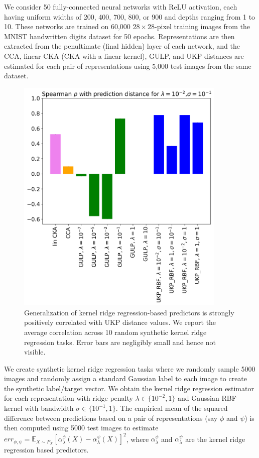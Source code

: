 \documentclass[11pt]{article}
\newcommand{\E}{\mathbb{E}}
\newcommand{\repone}{\phi}
\newcommand{\reptwo}{\psi}
\newcommand{\metricstname}{UKP }
\theoremstyle{plain}
\begin{document}
We consider 50 fully-connected neural networks with ReLU activation, each having uniform widths of 200, 400, 700, 800, or 900 and depths ranging from 1 to 10. These networks are trained on 60,000 $28 \times 28$-pixel training images from the MNIST handwritten digits dataset \cite{deng2012mnist} for 50 epochs. Representations are then extracted from the penultimate (final hidden) layer of each network, and the CCA, linear CKA (CKA with a linear kernel), GULP, and UKP distances are estimated for each pair of representations using 5,000 test images from the same dataset.

\begin{figure}[h]
\begin{center}
\includegraphics[width=10cm]{Figures/krrgen_mnist/generalization_lambda0.01_sigma0.1.png}
\caption{Generalization of kernel ridge regression-based predictors is strongly positively correlated with \metricstname distance values. We report the average correlation across 10 random synthetic kernel ridge regression tasks. Error bars are negligibly small and hence not visible.}
\label{Generalization plot}
\end{center}
\vspace{-4mm}
\end{figure}

We create synthetic kernel ridge regression tasks where we randomly sample 5000 images and randomly assign a standard Gaussian label to each image to create the synthetic label/target vector. We obtain the kernel ridge regression estimator for each representation with ridge penalty $\lambda \in \{10^{-2},1\}$ and Gaussian RBF kernel with bandwidth $\sigma \in \{10^{-1}, 1\}$. The empirical mean of the squared difference between predictions based on a pair of representations (say $\repone$ and $\reptwo$) is then computed using 5000 test images to estimate $err_{\repone,\reptwo} = \E_{X \sim P_{X}}\left[\alpha_{\lambda}^{\repone}(X)-\alpha_{\lambda}^{\reptwo}(X)\right]^{2}$, where $\alpha_{\lambda}^{\repone}$ and $\alpha_{\lambda}^{\reptwo}$ are the kernel ridge regression based predictors. 
\end{document}
